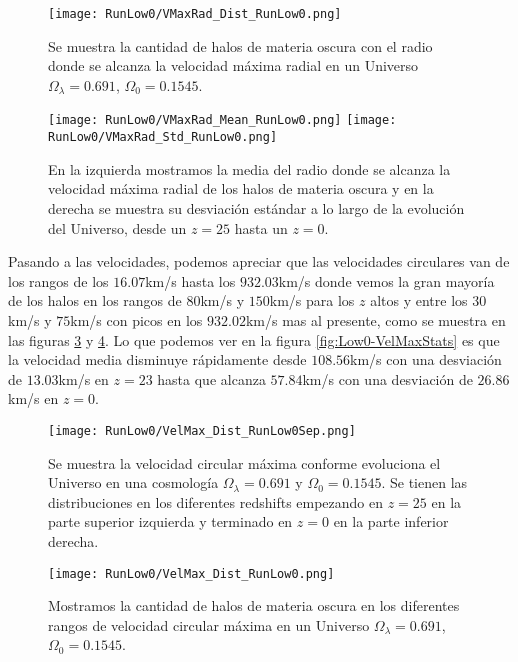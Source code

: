 \begin{figure}[H]
    \centering
    \texttt{[image: RunLow0/VMaxRad\_Dist\_RunLow0.png]}
    \caption[Distribución del radio donde se alcanza la velocidad máxima radial]{\footnotesize Se muestra la cantidad de halos de materia oscura con el radio donde se alcanza la velocidad máxima radial en un Universo $\Omega_\lambda = 0.691$, $\Omega_0 = 0.1545$.}
    \label{fig:Low0-VMaxRadDist}
\end{figure}

\begin{figure}[H]
    \centering
    \texttt{[image: RunLow0/VMaxRad\_Mean\_RunLow0.png]}
    \texttt{[image: RunLow0/VMaxRad\_Std\_RunLow0.png]}
    \caption[Media y desviación estándar del Radio donde se alcanza la velocidad máxima radial]{\footnotesize En la izquierda mostramos la media del radio donde se alcanza la velocidad máxima radial de los halos de materia oscura y en la derecha se muestra su desviación estándar a lo largo de la evolución del Universo, desde un $z=25$ hasta un $z=0$.}
    \label{fig:Low0-VMaxRadStats}
\end{figure}

Pasando a las velocidades, podemos apreciar que las velocidades circulares van de los rangos de los $16.07$km/s hasta los $932.03$km/s donde vemos la gran mayoría de los halos en los rangos de $80$km/s y $150$km/s para los $z$ altos y entre los $30$km/s y $75$km/s con picos en los $932.02$km/s mas al presente, como se muestra en las figuras \ref{fig:Low0-VelMaxDistSep} y \ref{fig:Low0-VelMaxDist}. Lo que podemos ver en la figura \ref{fig:Low0-VelMaxStats} es que la velocidad media disminuye rápidamente desde $108.56$km/s con una desviación de $13.03$km/s en $z=23$ hasta que alcanza $57.84$km/s con una desviación de $26.86$km/s en $z=0$.

\begin{figure}[H]
    \centering
    \texttt{[image: RunLow0/VelMax\_Dist\_RunLow0Sep.png]}
    \caption[Velocidad circular máxima]{\footnotesize Se muestra la velocidad circular máxima conforme evoluciona el Universo en una cosmología $\Omega_\lambda = 0.691$ y $\Omega_0 = 0.1545$. Se tienen las distribuciones en los diferentes redshifts empezando en $z=25$ en la parte superior izquierda y terminado en $z=0$ en la parte inferior derecha.}
    \label{fig:Low0-VelMaxDistSep}
\end{figure}

\begin{figure}[H]
    \centering
    \texttt{[image: RunLow0/VelMax\_Dist\_RunLow0.png]}
    \caption[Distribución de la velocidad circular máxima]{\footnotesize Mostramos la cantidad de halos de materia oscura en los diferentes rangos de velocidad circular máxima en un Universo $\Omega_\lambda = 0.691$, $\Omega_0 = 0.1545$.}
    \label{fig:Low0-VelMaxDist}
\end{figure}


